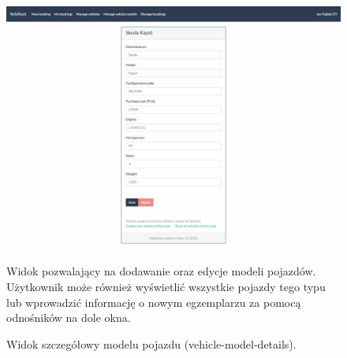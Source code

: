 \documentclass[eng,printmode,openany]{mgr}
\begin{document}
	\begin{figure}[H]
		\centering
		\includegraphics[width=\textwidth]{images/views/vehicle-model-detail.png}
		\caption{Widok szczegółowy modelu pojazdu (vehicle-model-details).}
		\small 
		Widok pozwalający na dodawanie oraz edycje modeli pojazdów. Użytkownik może również wyświetlić wszystkie pojazdy tego typu lub wprowadzić informację o nowym egzemplarzu za pomocą odnośników na dole okna.
	\end{figure}
	
\end{document}
